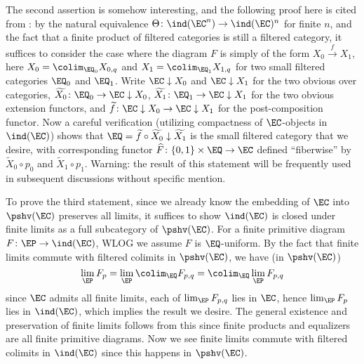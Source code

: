 \documentclass[twoside]{article}
\begin{document}
The second assertion is somehow interesting, and the following proof here is cited from \cite{KS06}: by the natural equivalence $\Theta\colon \ind(\EC^n) \rightarrow \ind(\EC)^n$ for finite $n$, and the fact that a finite product of filtered categories is still a filtered category, it suffices to consider the case where the diagram $F$ is simply of the form $X_0 \xrightarrow{f} X_1$, here $X_0 = \colim_{\EQ_0} X_{0,q}$ and $X_1 = \colim_{\EQ_1} X_{1, q}$ for two small filtered categories $\EQ_0$ and $\EQ_1$. Write $\EC \downarrow X_0$ and $\EC \downarrow X_1$ for the two obvious over categories,  $\widetilde{X_0}\colon \EQ_0 \rightarrow \EC\downarrow X_0$, $\widetilde{X_1}\colon \EQ_1 \rightarrow \EC\downarrow X_1$ for the two obvious extension functors, and $\widetilde{f}\colon \EC \downarrow X_0 \rightarrow \EC\downarrow X_1$ for the post-composition functor. Now a careful verification (utilizing compactness of $\EC$-objects in $\ind(\EC)$) shows that 
$\EQ = \widetilde{f} \circ \widetilde{X_0} \downarrow \widetilde{X_1}$
is the small filtered category that we desire, with corresponding functor $\widehat{F}\colon \{0,1\}\times \EQ \rightarrow \EC$ defined ``fiberwise'' by $\widetilde{X}_0 \circ p_0$ and $\widetilde{X}_1 \circ p_1$. Warning: the result of this statement will be frequently used in subsequent discussions without specific mention.\vspace{\topsep}

To prove the third statement, since we already know the embedding of $\EC$ into $\pshv(\EC)$ preserves all limits, it suffices to show $\ind(\EC)$ is closed under finite limits as a full subcategory of $\pshv(\EC)$. For a finite primitive diagram $F\colon \EP \rightarrow \ind(\EC)$, WLOG we assume $F$ is $\EQ$-uniform. By the fact that finite limits commute with filtered colimits in $\pshv(\EC)$, we have (in $\pshv(\EC)$)
$$\lim_\EP F_p = \lim_\EP \colim_\EQ F_{p,q} = \colim_\EQ \lim_\EP F_{p,q}$$
since $\EC$ admits all finite limits, each of $\lim_\EP F_{p,q}$ lies in $\EC$, hence $\lim_\EP F_p$ lies in $\ind(\EC)$, which implies the result we desire. The general existence and preservation of finite limits follows from this since finite products and equalizers are all finite primitive diagrams.  Now we see finite limits commute with filtered colimits in $\ind(\EC)$ since this happens in $\pshv(\EC)$.\vspace{\topsep}
\end{document}
